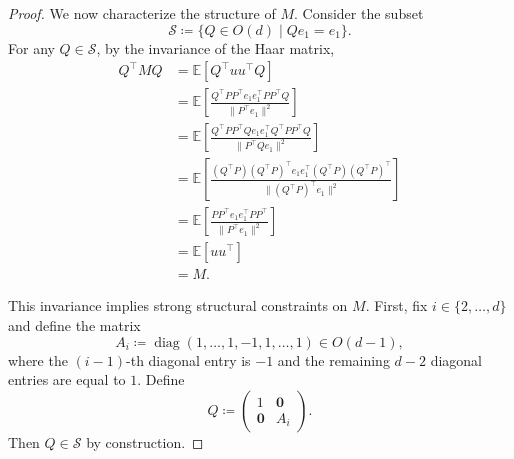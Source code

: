 \documentclass[10pt]{article}
\DeclareMathOperator{\diag}{diag}
\begin{document}
\begin{proof}
We now characterize the structure of $M$.
Consider the subset
\[
\mathcal{S} \coloneqq \{Q \in O(d) \mid Q e_1 = e_1\}.
\]
For any $Q \in \mathcal{S}$, by the invariance of the Haar matrix,
\begin{align*}
Q^\top M Q
&= \mathbb{E}[Q^\top uu^\top Q] \\
&= \mathbb{E}\!\left[\frac{Q^\top PP^\top e_1 e_1^\top PP^\top Q}{\|P^\top e_1\|^2}\right] \\
&= \mathbb{E}\!\left[\frac{Q^\top PP^\top Q e_1 e_1^\top Q^\top PP^\top Q}{\|P^\top Q e_1\|^2}\right] \\
&= \mathbb{E}\!\left[\frac{(Q^\top P)(Q^\top P)^\top e_1 e_1^\top (Q^\top P)(Q^\top P)^\top}{\|(Q^\top P)^\top e_1\|^2}\right] \\
&= \mathbb{E}\!\left[\frac{P P^\top e_1 e_1^\top PP^\top}{\|P^\top e_1\|^2}\right] \\
&= \mathbb{E}[uu^\top] \\
&= M.
\end{align*}

This invariance implies strong structural constraints on $M$.
First, fix $i \in \{2,\dots,d\}$ and define the matrix
\[
A_i \coloneqq \diag(1,\dots,1,-1,1,\dots,1) \in O(d-1),
\]
where the $(i-1)$-th diagonal entry is $-1$ and the remaining $d-2$ diagonal
entries are equal to $1$.
Define
\[
Q \coloneqq
\begin{pmatrix}
1 & \mathbf{0} \\
\mathbf{0} & A_i
\end{pmatrix}.
\]
Then $Q \in \mathcal{S}$ by construction.


\end{proof}
\end{document}
